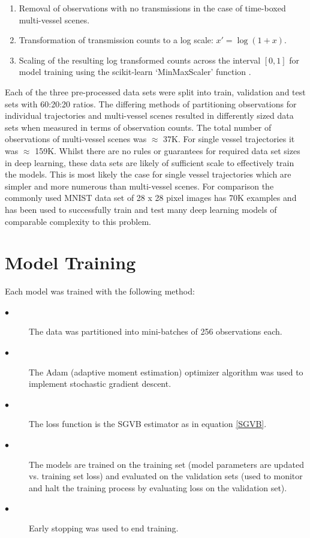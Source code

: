 \documentclass{mldsmsc}
\begin{document}
\begin{enumerate}
	\item Removal of observations with no transmissions in the case of time-boxed multi-vessel scenes.
	\item Transformation of transmission counts to a log scale: \( x' = \log(1 + x) \).
	\item Scaling of the resulting log transformed counts across the interval \( [0,1] \) for model training using the scikit-learn  `MinMaxScaler' function \citep{scikit-learn}. 
\end{enumerate}

Each of the three pre-processed data sets were split into train, validation and test sets with 60:20:20 ratios. The differing methods of partitioning observations for individual trajectories and multi-vessel scenes resulted in differently sized data sets when measured in terms of observation counts. The total number of observations of multi-vessel scenes was $\approx$ 37K. For single vessel trajectories it was $\approx$ 159K. Whilst there are no rules or guarantees for required data set sizes in deep learning, these data sets are likely of sufficient scale to effectively train the models. This is most likely the case for single vessel trajectories which are simpler and more numerous than multi-vessel scenes. For comparison the commonly used MNIST data set of 28 x 28 pixel images has 70K examples \citep{deng2012mnist}  and has been used to successfully train and test  many deep learning models of comparable complexity to this problem.

\section{Model Training}

Each model was trained with the following method:

\begin{description}

	\item [$\bullet$] The data was partitioned into mini-batches of 256 observations each.
	\item [$\bullet$] The Adam (adaptive moment estimation) optimizer algorithm was used to implement stochastic gradient descent.
	\item [$\bullet$] The loss function is the SGVB estimator as in equation \ref{SGVB}.
	\item [$\bullet$] The models are trained on the training set (model parameters are updated vs. training set loss) and evaluated on the validation sets (used to monitor and halt the training process by evaluating loss on the validation set).
	\item [$\bullet$] Early stopping was used to end training.
\end{description}
\end{document}
